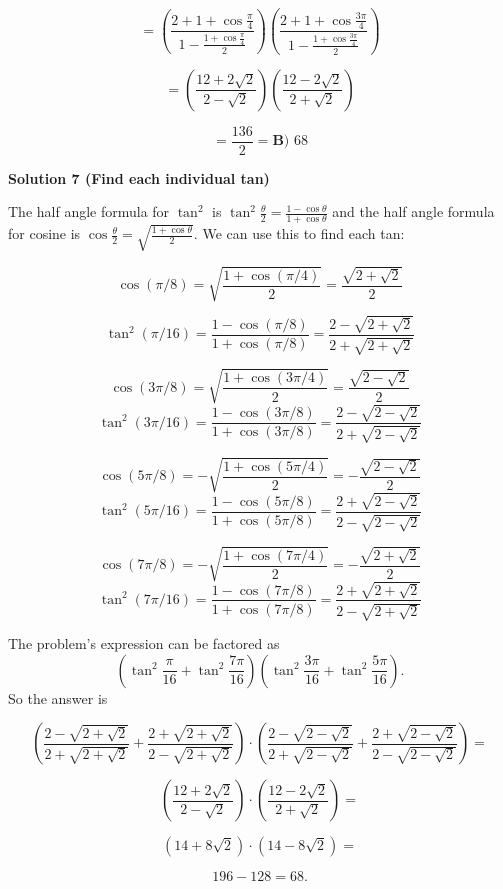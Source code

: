 \begin{enumerate}
 \[=(\frac{2+1+\cos\frac{\pi}{4}}{1-\frac{1+\cos\frac{\pi}{4}}{2}})(\frac{2+1+\cos\frac{3\pi}{4}}{1-\frac{1+\cos\frac{3\pi}{4}}{2}})\]

 \[=(\frac{12+2\sqrt{2}}{2-\sqrt{2}})(\frac{12-2\sqrt{2}}{2+\sqrt{2}})\]

 \[=\frac{136}{2}=\boxed{\textbf{B) }68 }\]




\textbf{Solution 7 (Find each individual tan)}

The half angle formula for $\tan^2$ is $\tan^2\frac{\theta}{2} = \frac{1 - \cos\theta}{1 + \cos\theta}$ and the half angle formula for cosine is $\cos\frac{\theta}{2} = \sqrt{\frac{1 + \cos\theta}{2}}.$ We can use this to find each tan:

 
 \[\cos(\pi/8) = \sqrt{\frac{1 + \cos(\pi/4)}{2}} = \frac{\sqrt{2 + \sqrt{2}}}{2}\]

 \[\tan^2(\pi/16) = \frac{1 - \cos(\pi/8)}{1 + \cos(\pi/8)} = \frac{2 - \sqrt{2 + \sqrt{2}}}{2 + \sqrt{2 + \sqrt{2}}}\]

 \[\cos(3\pi/8) = \sqrt{\frac{1 + \cos(3\pi/4)}{2}} = \frac{\sqrt{2 - \sqrt{2}}}{2}\]
 \[\tan^2(3\pi/16) = \frac{1 - \cos(3\pi/8)}{1 + \cos(3\pi/8)} = \frac{2 - \sqrt{2 - \sqrt{2}}}{2 + \sqrt{2 - \sqrt{2}}}\]

 \[\cos(5\pi/8) = - \sqrt{\frac{1 + \cos(5\pi/4)}{2}} = -\frac{\sqrt{2 - \sqrt{2}}}{2}\]
 \[\tan^2(5\pi/16) = \frac{1 - \cos(5\pi/8)}{1 + \cos(5\pi/8)} = \frac{2 + \sqrt{2 - \sqrt{2}}}{2 - \sqrt{2 - \sqrt{2}}}\]

 \[\cos(7\pi/8) = - \sqrt{\frac{1 + \cos(7\pi/4)}{2}} = -\frac{\sqrt{2 + \sqrt{2}}}{2}\]
 \[\tan^2(7\pi/16) = \frac{1 - \cos(7\pi/8)}{1 + \cos(7\pi/8)} = \frac{2 + \sqrt{2 + \sqrt{2}}}{2 - \sqrt{2 + \sqrt{2}}}\]

 
The problem's expression can be factored as 
 \[(\tan^2\frac{\pi}{16}+\tan^2 \frac{7\pi}{16})(\tan^2\frac{3\pi}{16}+\tan^2 \frac{5\pi}{16}).\] So the answer is

 
 \[(\frac{2 - \sqrt{2 + \sqrt{2}}}{2 + \sqrt{2 + \sqrt{2}}} + \frac{2 + \sqrt{2 + \sqrt{2}}}{2 - \sqrt{2 + \sqrt{2}}}) \cdot (\frac{2 - \sqrt{2 - \sqrt{2}}}{2 + \sqrt{2 - \sqrt{2}}} + \frac{2 + \sqrt{2 - \sqrt{2}}}{2 - \sqrt{2 - \sqrt{2}}}) =\]

 \[(\frac{12 + 2\sqrt{2}}{2 - \sqrt{2}}) \cdot (\frac{12 - 2\sqrt{2}}{2 + \sqrt{2}}) =\]

 \[(14 + 8\sqrt{2}) \cdot (14 - 8\sqrt{2}) =\]

 \[196 - 128 = \boxed{68}.\]





\end{enumerate}
